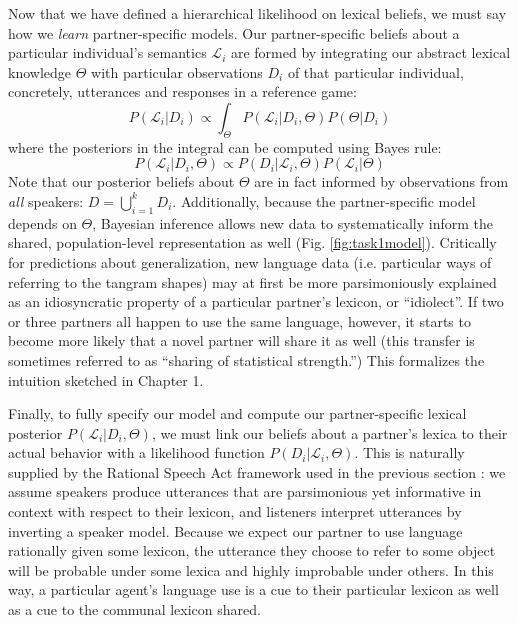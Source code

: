 Now that we have defined a hierarchical likelihood on lexical beliefs, we must say how we \emph{learn} partner-specific models. 
Our partner-specific beliefs about a particular individual's semantics $\mathcal{L}_i$ are formed by integrating our abstract lexical knowledge $\Theta$ with particular  observations $D_i$ of that particular individual, concretely, utterances and responses in a reference game:
$$%
P(\mathcal{L}_i | D_i)  \propto \int_{\Theta}P(\mathcal{L}_i | D_i,  \Theta) P(\Theta | D_i) 
$$
where the posteriors in the integral can be computed using Bayes rule:
$$
P(\mathcal{L}_i | D_i, \Theta) \propto P(D_i | \mathcal{L}_i, \Theta) P(\mathcal{L}_i | \Theta)
$$
Note that our posterior beliefs about $\Theta$ are in fact informed by observations from \emph{all} speakers: $D = \bigcup_{i=1}^k D_i$. 
Additionally, because the partner-specific model depends on $\Theta$, Bayesian inference allows new data to systematically inform the shared, population-level representation as well (Fig. \ref{fig:task1model}).
Critically for predictions about generalization, new language data (i.e. particular ways of referring to the tangram shapes) may at first be more parsimoniously explained as an idiosyncratic property of a particular partner's lexicon, or ``idiolect''. 
If two or three partners all happen to use the same language, however, it starts to become more likely that a novel partner will share it as well (this transfer is sometimes referred to as ``sharing of statistical strength.'')
This formalizes the intuition sketched in Chapter 1.


Finally, to fully specify our model and compute our partner-specific lexical posterior $P(\mathcal{L}_i | D_i, \Theta)$, we must link our beliefs about a partner's lexica to their actual behavior with a likelihood function $P(D_i | \mathcal{L}_i, \Theta)$. 
This is naturally supplied by the Rational Speech Act framework used in the previous section \cite{FrankGoodman12_PragmaticReasoningLanguageGames,GoodmanFrank16_RSATiCS,BergenLevyGoodman16_LexicalUncertainty,SmithGoodmanFrank13_RecursivePragmaticReasoningNIPS}: we assume speakers produce utterances that are parsimonious yet informative in context with respect to their lexicon, and listeners interpret utterances by inverting a speaker model. Because we expect our partner to use language rationally given some lexicon, the utterance they choose to refer to some object will be probable under some lexica and highly improbable under others. 
In this way, a particular agent's language use is a cue to their particular lexicon as well as a cue to the communal lexicon shared. 


